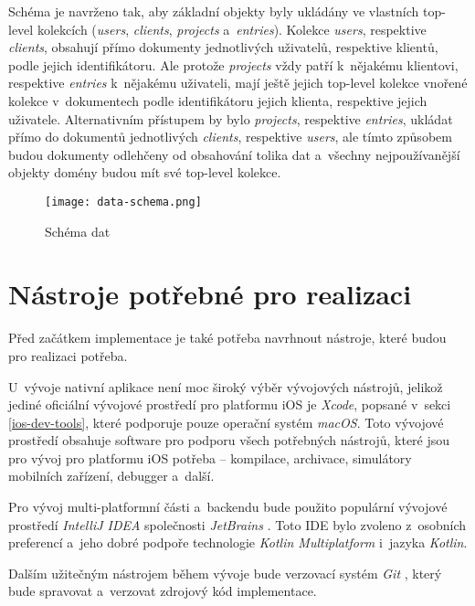 Schéma je navrženo tak, aby základní objekty byly ukládány ve vlastních top-level kolekcích (\emph{users}, \emph{clients}, \emph{projects} a~\emph{entries}). Kolekce \emph{users}, respektive \emph{clients}, obsahují přímo dokumenty jednotlivých uživatelů, respektive klientů, podle jejich identifikátoru. Ale protože \emph{projects} vždy patří k~nějakému klientovi, respektive \emph{entries} k~nějakému uživateli, mají ještě jejich top-level kolekce vnořené kolekce v~dokumentech podle identifikátoru jejich klienta, respektive jejich uživatele. Alternativním přístupem by bylo \emph{projects}, respektive \emph{entries}, ukládat přímo do dokumentů jednotlivých \emph{clients}, respektive \emph{users}, ale tímto způsobem budou dokumenty odlehčeny od obsahování tolika dat a~všechny nejpoužívanější objekty domény budou mít své top-level kolekce.

\begin{figure}[h]
	\centering
	\texttt{[image: data-schema.png]}
	\caption{Schéma dat}
	\label{fig:data-schema}
\end{figure}

\section{Nástroje potřebné pro realizaci}\label{dev-tools}

Před začátkem implementace je také potřeba navrhnout nástroje, které budou pro realizaci potřeba.

U~vývoje nativní aplikace není moc široký výběr vývojových nástrojů, jelikož jediné oficiální vývojové prostředí pro platformu iOS je \emph{Xcode}, popsané v~sekci \ref{ios-dev-tools}, které podporuje pouze operační systém \emph{macOS}. Toto vývojové prostředí obsahuje software pro podporu všech potřebných nástrojů, které jsou pro vývoj pro platformu iOS potřeba – kompilace, archivace, simulátory mobilních zařízení, debugger a~další.

Pro vývoj multi-platformní části a~backendu bude použito populární vývojové prostředí \emph{IntelliJ IDEA} společnosti \emph{JetBrains} \cite{intellij}. Toto IDE bylo zvoleno z~osobních preferencí a~jeho dobré podpoře technologie \emph{Kotlin Multiplatform} i~jazyka \emph{Kotlin}.

Dalším užitečným nástrojem během vývoje bude verzovací systém \emph{Git} \cite{git}, který bude spravovat a~verzovat zdrojový kód implementace. 





































